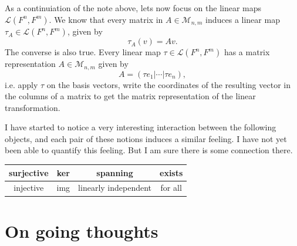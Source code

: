 \begin{observation}
	As a continuiation of the note above, lets now focus on the linear maps $ \mathcal{L}(F^n,F^m) $. We know that every matrix in $ A \in \mathcal{M}_{n,m} $ induces a linear map $ \tau_A \in \mathcal{L}(F^n,F^m) $, given by
	\[ \tau_A(v) = A v. \]
	The converse is also true. Every linear map $ \tau \in \mathcal{L}(F^n,F^m) $ has a matrix representation $ A \in \mathcal{M}_{n,m} $ given by
	\[ A = (\tau e_1 | \cdots | \tau e_n), \]
	i.e. apply $ \tau $ on the basis vectors, write the coordinates of the resulting vector in the columns of a matrix to get the matrix representation of the linear transformation.
\end{observation}


\begin{observation}
	I have started to notice a very interesting interaction between the following objects, and each pair of these notions induces a similar feeling. I have not yet been able to quantify this feeling. But I am sure there is some connection there. 
	\begin{center}
		\begin{tabular}{|c|c|c|c|}

			surjective & ker & spanning & exists \\
			\hline
			injective & img & linearly independent & for all \\

		\end{tabular}
	\end{center}
\end{observation}




\section{On going thoughts}






